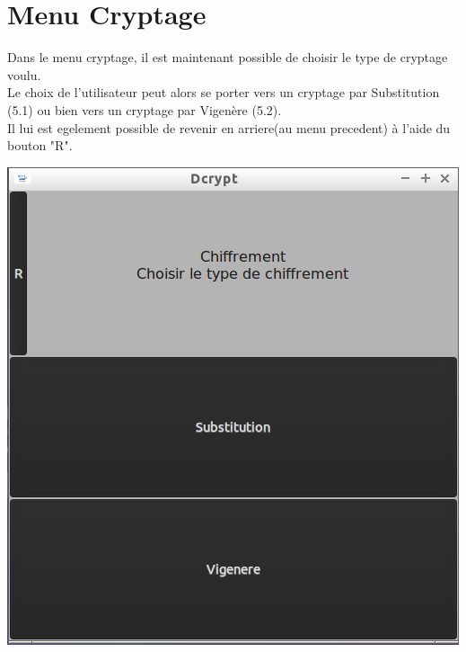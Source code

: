 \documentclass[a4]{article}
\begin{document}
			
			
	\section{Menu Cryptage}
		Dans le menu cryptage, il est maintenant possible de choisir le type de cryptage voulu.\\
 		Le choix de l'utilisateur peut alors se porter vers un cryptage par Substitution (5.1) ou bien
 		vers un cryptage par Vigenère (5.2).\\
 		Il lui est egelement possible de revenir en arriere(au menu precedent) à l'aide du bouton "R".
		\begin{center}\includegraphics[scale=0.4]{2.png}\end{center}
\end{document}
